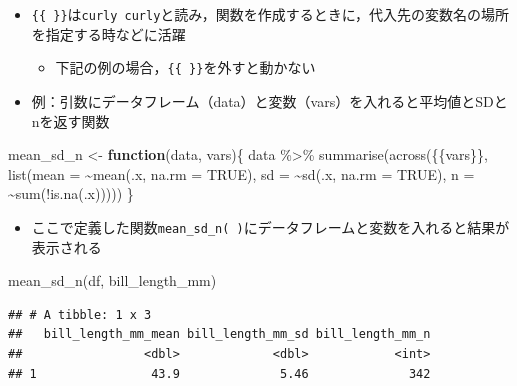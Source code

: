 \documentclass[
  xelatex,ja=standard, b5paper]{bxjsbook}
\newenvironment{Shaded}{\begin{snugshade}}{\end{snugshade}}
\newcommand{\AttributeTok}[1]{\textcolor[rgb]{0.77,0.63,0.00}{#1}}
\newcommand{\ConstantTok}[1]{\textcolor[rgb]{0.00,0.00,0.00}{#1}}
\newcommand{\ControlFlowTok}[1]{\textcolor[rgb]{0.13,0.29,0.53}{\textbf{#1}}}
\newcommand{\FunctionTok}[1]{\textcolor[rgb]{0.00,0.00,0.00}{#1}}
\newcommand{\NormalTok}[1]{#1}
\newcommand{\OtherTok}[1]{\textcolor[rgb]{0.56,0.35,0.01}{#1}}
\newcommand{\SpecialCharTok}[1]{\textcolor[rgb]{0.00,0.00,0.00}{#1}}
\providecommand{\tightlist}{%
  \setlength{\itemsep}{0pt}\setlength{\parskip}{0pt}}
\begin{document}
\begin{itemize}
\tightlist
\item
  \texttt{\{\{\ \}\}}は\texttt{curly\ curly}と読み，関数を作成するときに，代入先の変数名の場所を指定する時などに活躍

  \begin{itemize}
  \tightlist
  \item
    下記の例の場合，\texttt{\{\{\ \}\}}を外すと動かない
  \end{itemize}
\item
  例：引数にデータフレーム（data）と変数（vars）を入れると平均値とSDとnを返す関数
\end{itemize}

\begin{Shaded}
\begin{Highlighting}[]
\NormalTok{mean\_sd\_n }\OtherTok{\textless{}{-}} \ControlFlowTok{function}\NormalTok{(data, vars)\{}
\NormalTok{data }\SpecialCharTok{\%\textgreater{}\%} 
  \FunctionTok{summarise}\NormalTok{(}\FunctionTok{across}\NormalTok{(\{\{vars\}\},}
                   \FunctionTok{list}\NormalTok{(}\AttributeTok{mean =} \SpecialCharTok{\textasciitilde{}}\FunctionTok{mean}\NormalTok{(.x, }\AttributeTok{na.rm =} \ConstantTok{TRUE}\NormalTok{),}
                        \AttributeTok{sd =} \SpecialCharTok{\textasciitilde{}}\FunctionTok{sd}\NormalTok{(.x, }\AttributeTok{na.rm =} \ConstantTok{TRUE}\NormalTok{),}
                        \AttributeTok{n =} \SpecialCharTok{\textasciitilde{}}\FunctionTok{sum}\NormalTok{(}\SpecialCharTok{!}\FunctionTok{is.na}\NormalTok{(.x)))))}
\NormalTok{\}}
\end{Highlighting}
\end{Shaded}

\begin{itemize}
\tightlist
\item
  ここで定義した関数\texttt{mean\_sd\_n(\ )}にデータフレームと変数を入れると結果が表示される
\end{itemize}

\begin{Shaded}
\begin{Highlighting}[]
\FunctionTok{mean\_sd\_n}\NormalTok{(df, bill\_length\_mm)}
\end{Highlighting}
\end{Shaded}

\begin{verbatim}
## # A tibble: 1 x 3
##   bill_length_mm_mean bill_length_mm_sd bill_length_mm_n
##                 <dbl>             <dbl>            <int>
## 1                43.9              5.46              342
\end{verbatim}
\end{document}
